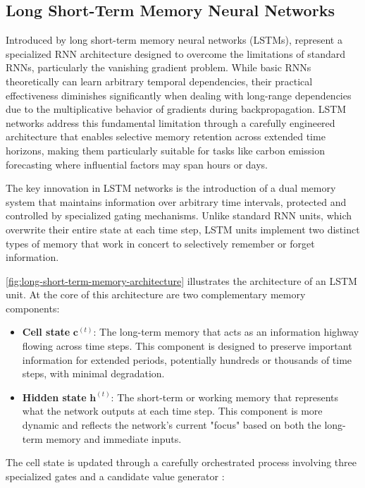 \subsection{Long Short-Term Memory Neural Networks}

Introduced by \textcite{hochreiter1997} long short-term memory neural networks (LSTMs), represent a specialized RNN architecture designed to overcome the limitations of standard RNNs, particularly the vanishing gradient problem. While basic RNNs theoretically can learn arbitrary temporal dependencies, their practical effectiveness diminishes significantly when dealing with long-range dependencies due to the multiplicative behavior of gradients during backpropagation. LSTM networks address this fundamental limitation through a carefully engineered architecture that enables selective memory retention across extended time horizons, making them particularly suitable for tasks like carbon emission forecasting where influential factors may span hours or days.

The key innovation in LSTM networks is the introduction of a dual memory system that maintains information over arbitrary time intervals, protected and controlled by specialized gating mechanisms. Unlike standard RNN units, which overwrite their entire state at each time step, LSTM units implement two distinct types of memory that work in concert to selectively remember or forget information.

\autoref{fig:long-short-term-memory-architecture} illustrates the architecture of an LSTM unit. At the core of this architecture are two complementary memory components:

\begin{itemize}
  \item \textbf{Cell state} \(\mathbf{c}^{(t)}\): The long-term memory that acts as an information highway flowing across time steps. This component is designed to preserve important information for extended periods, potentially hundreds or thousands of time steps, with minimal degradation.
  \item \textbf{Hidden state} \(\mathbf{h}^{(t)}\): The short-term or working memory that represents what the network outputs at each time step. This component is more dynamic and reflects the network's current "focus" based on both the long-term memory and immediate inputs.
\end{itemize}

The cell state is updated through a carefully orchestrated process involving three specialized gates and a candidate value generator \parencite{hochreiter1997}:

